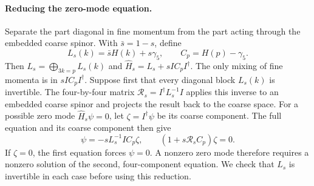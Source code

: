 \documentclass[11pt,a4paper]{article}
\theoremstyle{remark}
\begin{document}
\paragraph{Reducing the zero-mode equation.}
Separate the part diagonal in fine momentum from the part acting
through the embedded coarse spinor. With $\bar s=1-s$, define
\begin{equation}
 L_s(k)=\bar s H(k)+s\gamma_5,\qquad
 C_p=H(p)-\gamma_5 .
\end{equation}
Then $L_s=\bigoplus_{3k=p}L_s(k)$ and
$\widehat H_s=L_s+sIC_pI^\dagger$. The only mixing of fine momenta is in $sIC_pI^\dagger$. Suppose
first that every diagonal block $L_s(k)$ is invertible. The
four-by-four matrix $\mathcal R_s=I^\dagger L_s^{-1}I$ applies
this inverse to an embedded coarse spinor and projects the result
back to the coarse space. For a possible zero mode
$\widehat H_s\psi=0$, let $\zeta=I^\dagger\psi$ be its
coarse component. The full equation and its coarse component then give
\begin{equation}
 \psi=-sL_s^{-1}IC_p\zeta,\qquad
 (1+s\mathcal R_sC_p)\zeta=0.
\end{equation}
If $\zeta=0$, the first equation forces $\psi=0$. A nonzero
zero mode therefore requires a nonzero solution of the second,
four-component equation. We check that $L_s$ is invertible in each
case before using this reduction.
\end{document}
